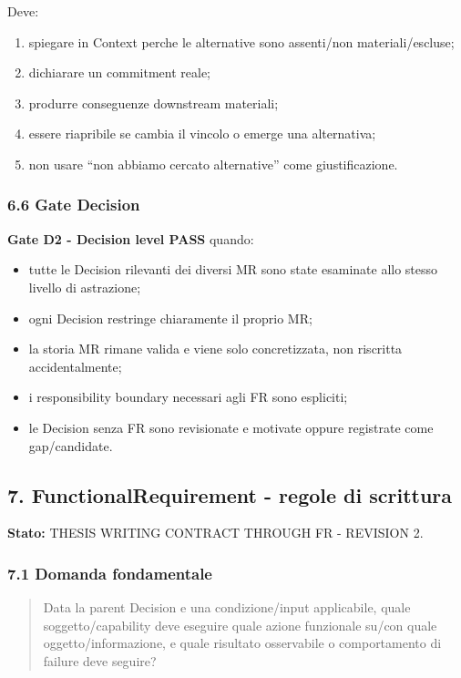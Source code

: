 \documentclass[
  9pt,
  a4paper,
]{article}
\providecommand{\tightlist}{%
  \setlength{\itemsep}{0pt}\setlength{\parskip}{0pt}}
\begin{document}
Deve:

\begin{enumerate}
\def\labelenumi{\arabic{enumi}.}
\tightlist
\item
  spiegare in Context perche le alternative sono assenti/non
  materiali/escluse;
\item
  dichiarare un commitment reale;
\item
  produrre conseguenze downstream materiali;
\item
  essere riapribile se cambia il vincolo o emerge una alternativa;
\item
  non usare ``non abbiamo cercato alternative'' come giustificazione.
\end{enumerate}

\subsubsection{6.6 Gate Decision}\label{gate-decision}

\textbf{Gate D2 - Decision level PASS} quando:

\begin{itemize}
\tightlist
\item
  tutte le Decision rilevanti dei diversi MR sono state esaminate allo
  stesso livello di astrazione;
\item
  ogni Decision restringe chiaramente il proprio MR;
\item
  la storia MR rimane valida e viene solo concretizzata, non riscritta
  accidentalmente;
\item
  i responsibility boundary necessari agli FR sono espliciti;
\item
  le Decision senza FR sono revisionate e motivate oppure registrate
  come gap/candidate.
\end{itemize}

\subsection{7. FunctionalRequirement - regole di
scrittura}\label{functionalrequirement---regole-di-scrittura}

\textbf{Stato:} THESIS WRITING CONTRACT THROUGH FR - REVISION 2.

\subsubsection{7.1 Domanda fondamentale}\label{domanda-fondamentale}

\begin{quote}
Data la parent Decision e una condizione/input applicabile, quale
soggetto/capability deve eseguire quale azione funzionale su/con quale
oggetto/informazione, e quale risultato osservabile o comportamento di
failure deve seguire?
\end{quote}
\end{document}
